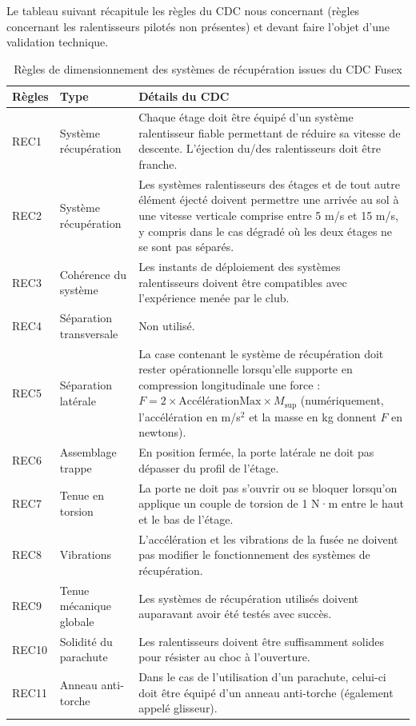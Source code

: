 Le tableau suivant récapitule les règles du \acrshort{CDC} nous concernant (règles concernant les ralentisseurs pilotés non
présentes) et devant faire l'objet d'une validation technique.

\begin{table}[h!]
    \centering
    \begin{tabular}{|p{1.2cm}|p{4cm}|p{10cm}|}
        \hline
        Règles & Type & Détails du \acrshort{CDC} \\ \hline
        REC1  & Système récupération & Chaque étage doit être équipé d’un système ralentisseur fiable permettant de réduire sa vitesse de descente. L’éjection du/des ralentisseurs doit être franche. \\ \hline
        REC2  & Système récupération & Les systèmes ralentisseurs des étages et de tout autre élément éjecté doivent permettre une arrivée au sol à une vitesse verticale comprise entre 5 m/s et 15 m/s, y compris dans le cas dégradé où les deux étages ne se sont pas séparés. \\ \hline
        REC3  & Cohérence du système & Les instants de déploiement des systèmes ralentisseurs doivent être compatibles avec l’expérience menée par le club. \\ \hline
        REC4  & Séparation transversale & Non utilisé. \\ \hline
        REC5  & Séparation latérale & La case contenant le système de récupération doit rester opérationnelle lorsqu’elle supporte en compression longitudinale une force : $F = 2 \times \text{Accélération}{\text{Max}} \times M_{\text{sup}}$ (numériquement, l’accélération en m/s$^2$ et la masse en kg donnent $F$ en newtons). \\ \hline
        REC6  & Assemblage trappe & En position fermée, la porte latérale ne doit pas dépasser du profil de l’étage. \\ \hline
        REC7  & Tenue en torsion & La porte ne doit pas s’ouvrir ou se bloquer lorsqu’on applique un couple de torsion de 1 N·m entre le haut et le bas de l’étage. \\ \hline
        REC8  & Vibrations & L’accélération et les vibrations de la fusée ne doivent pas modifier le fonctionnement des systèmes de récupération. \\ \hline
        REC9  & Tenue mécanique globale & Les systèmes de récupération utilisés doivent auparavant avoir été testés avec succès. \\ \hline
        REC10 & Solidité du parachute & Les ralentisseurs doivent être suffisamment solides pour résister au choc à l’ouverture. \\ \hline
        REC11 & Anneau anti-torche & Dans le cas de l’utilisation d’un parachute, celui-ci doit être équipé d’un anneau anti-torche (également appelé glisseur). \\ \hline
    \end{tabular}
    \caption{Règles de dimensionnement des systèmes de récupération issues du \acrshort{CDC} \gls{Fusex} \cite[p.~36-42]{CDC_BiEtage}}
\end{table}

